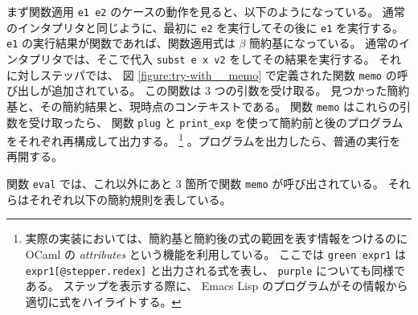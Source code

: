 まず関数適用 \texttt{e1 e2} のケースの動作を見ると、以下のようになっている。
通常のインタプリタと同じように、最初に \texttt{e2} を実行してその後に \texttt{e1} を実行する。
\texttt{e1} の実行結果が関数であれば、関数適用式は $\beta$ 簡約基になっている。
通常のインタプリタでは、そこで代入 \texttt{subst e x v2} をしてその結果を実行する。
それに対しステッパでは、
図 \ref{figure:try-with__memo} で定義された関数 \texttt{memo} の呼び出しが追加されている。
この関数は 3 つの引数を受け取る。
見つかった簡約基と、その簡約結果と、現時点のコンテキストである。
関数 \texttt{memo} はこれらの引数を受け取ったら、
関数 \texttt{plug} と \texttt{print\_exp} を使って簡約前と後のプログラムをそれぞれ再構成して出力する。
\footnote{
    実際の実装においては、簡約基と簡約後の式の範囲を表す情報をつけるのに
    OCaml の \emph{attributes} という機能を利用している。
    ここでは \texttt{green expr1} は \texttt{expr1[@stepper.redex]} と出力される式を表し、
    \texttt{purple} についても同様である。
    ステップを表示する際に、 Emacs Lisp のプログラムがその情報から
    適切に式をハイライトする。
    }
    。プログラムを出力したら、普通の実行を再開する。

関数 \texttt{eval} では、これ以外にあと 3 箇所で関数 \texttt{memo} が呼び出されている。
それらはそれぞれ以下の簡約規則を表している。

